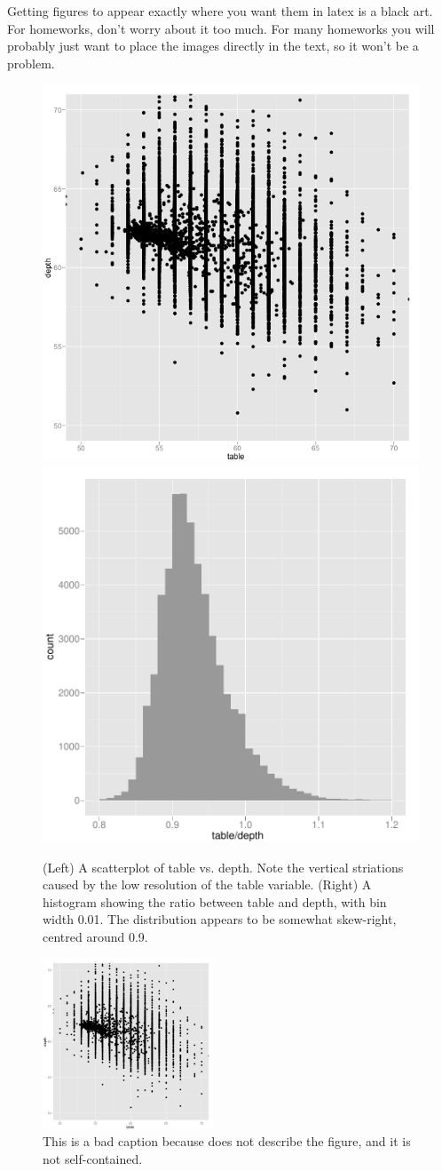\documentclass[oneside]{article}
\begin{document}
Getting figures to appear exactly where you want them in latex is a black art.  For homeworks, don't worry about it too much.  For many homeworks you will probably just want to place the images directly in the text, so it won't be a problem.

\begin{figure}[htbp]
  \includegraphics[width = 0.5\linewidth]{table-depth} %
  \includegraphics[width = 0.5\linewidth]{table-depth-ratio}
  \caption{(Left) A scatterplot of table vs. depth.  Note the vertical striations caused by the low resolution of the table variable. (Right) A histogram showing the ratio between table and depth, with bin width 0.01.  The distribution appears to be somewhat skew-right, centred around 0.9.}
  \label{fig:two}
\end{figure}

\begin{figure}[htbp]
  
  \centering
  \includegraphics[width = 2in]{table-depth}
  \caption{This is a bad caption because does not describe the figure, and it is not self-contained.}
  \label{fig:one}
\end{figure}
\end{document}
